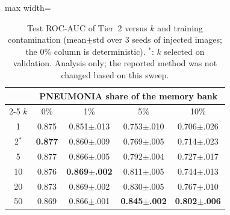 \begin{table}[t]
\centering
\footnotesize
\setlength{\tabcolsep}{3.5pt}
\begin{adjustbox}{max width=\columnwidth}
\begin{tabular}{ccccc}
\toprule
 & \multicolumn{4}{c}{PNEUMONIA share of the memory bank} \\
\cmidrule(lr){2-5}
$k$ & 0\% & 1\% & 5\% & 10\% \\
\midrule
1 & 0.875 & 0.851{\scriptsize$\pm$.013} & 0.753{\scriptsize$\pm$.010} & 0.706{\scriptsize$\pm$.026} \\
2$^\ast$ & \textbf{0.877} & 0.860{\scriptsize$\pm$.009} & 0.769{\scriptsize$\pm$.005} & 0.714{\scriptsize$\pm$.023} \\
5 & 0.877 & 0.866{\scriptsize$\pm$.005} & 0.792{\scriptsize$\pm$.004} & 0.727{\scriptsize$\pm$.017} \\
10 & 0.876 & \textbf{0.869{\scriptsize$\pm$.002}} & 0.811{\scriptsize$\pm$.005} & 0.744{\scriptsize$\pm$.013} \\
20 & 0.873 & 0.869{\scriptsize$\pm$.002} & 0.830{\scriptsize$\pm$.005} & 0.767{\scriptsize$\pm$.010} \\
50 & 0.869 & 0.866{\scriptsize$\pm$.001} & \textbf{0.845{\scriptsize$\pm$.002}} & \textbf{0.802{\scriptsize$\pm$.006}} \\
\bottomrule
\end{tabular}
\end{adjustbox}
\caption{Test ROC-AUC of Tier~2 versus $k$ and training contamination (mean{\scriptsize$\pm$std} over 3 seeds of injected images; the 0\% column is deterministic). $^\ast$: $k$ selected on validation. Analysis only; the reported method was not changed based on this sweep.}
\label{tab:k-contam}
\end{table}
